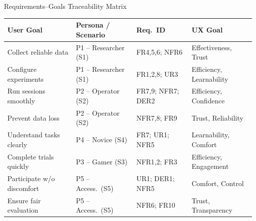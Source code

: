 \documentclass[aspectratio=169, 10pt]{beamer}
\begin{document}
\begin{frame}{Requirements--Goals Traceability Matrix}
  \scriptsize
  \begin{tabular}{@{}p{2.8cm} p{3.5cm} p{2.8cm} p{2.8cm}@{}}
    \toprule
    \textbf{User Goal} & \textbf{Persona / Scenario} & \textbf{Req.\ ID} & \textbf{UX Goal} \\
    \midrule
    Collect reliable data        & P1 -- Researcher (S1) & FR4,5,6; NFR6 & Effectiveness, Trust \\
    Configure experiments        & P1 -- Researcher (S1) & FR1,2,8; UR3  & Efficiency, Learnability \\
    Run sessions smoothly        & P2 -- Operator (S2)   & FR7,9; NFR7; DER2 & Efficiency, Confidence \\
    Prevent data loss            & P2 -- Operator (S2)   & NFR7,8; FR9   & Trust, Reliability \\
    Understand tasks clearly     & P4 -- Novice (S4)     & FR7; UR1; NFR5 & Learnability, Comfort \\
    Complete trials quickly      & P3 -- Gamer (S3)      & NFR1,2; FR3   & Efficiency, Engagement \\
    Participate w/o discomfort   & P5 -- Access.\ (S5)   & UR1; DER1; NFR5 & Comfort, Control \\
    Ensure fair evaluation       & P5 -- Access.\ (S5)   & NFR6; FR10    & Trust, Transparency \\
    \bottomrule
  \end{tabular}
\end{frame}
\end{document}
